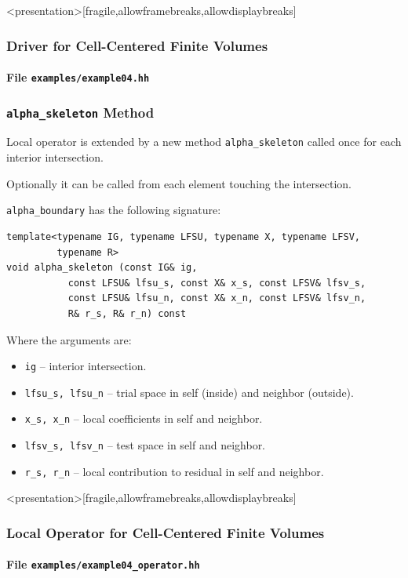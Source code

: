 \begin{frame}<presentation>[fragile,allowframebreaks,allowdisplaybreaks]
\frametitle<presentation>{Driver for Cell-Centered Finite Volumes}
\framesubtitle<presentation>{File \texttt{examples/example04.hh}}

\end{frame}

\begin{frame}[fragile]
\frametitle{\lstinline{alpha_skeleton} Method}
Local operator is extended by a new method \lstinline{alpha_skeleton}
called once for each interior intersection.

Optionally it can be called from each element touching the intersection.

\lstinline{alpha_boundary} has the following signature: 
\begin{lstlisting}[basicstyle=\scriptsize]
template<typename IG, typename LFSU, typename X, typename LFSV, 
         typename R>
void alpha_skeleton (const IG& ig, 
           const LFSU& lfsu_s, const X& x_s, const LFSV& lfsv_s,
           const LFSU& lfsu_n, const X& x_n, const LFSV& lfsv_n, 
           R& r_s, R& r_n) const
\end{lstlisting}
Where the arguments are:
\begin{itemize}
\item \lstinline{ig} -- interior intersection.
\item \lstinline{lfsu_s, lfsu_n} -- trial space in self (inside) and neighbor (outside).
\item \lstinline{x_s, x_n} -- local coefficients in self and neighbor.
\item \lstinline{lfsv_s, lfsv_n} -- test space in self and neighbor. 
\item \lstinline{r_s, r_n} -- local contribution to residual in self and neighbor.
\end{itemize}
\end{frame}

\begin{frame}<presentation>[fragile,allowframebreaks,allowdisplaybreaks]
\frametitle<presentation>{Local Operator for Cell-Centered Finite Volumes}
\framesubtitle<presentation>{File \texttt{examples/example04\_operator.hh}}

\end{frame}


